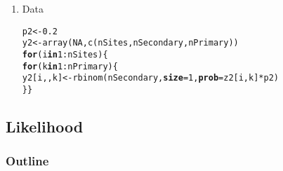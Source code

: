 \documentclass[color=usenames,dvipsnames]{beamer}\usepackage[]{graphicx}\usepackage[]{color}
\makeatletter
\newcommand{\hlnum}[1]{\textcolor[rgb]{0.69,0.494,0}{#1}}%
\newcommand{\hlopt}[1]{\textcolor[rgb]{0,0,0}{#1}}%
\newcommand{\hlstd}[1]{\textcolor[rgb]{0,0,0}{#1}}%
\newcommand{\hlkwa}[1]{\textcolor[rgb]{0,0,0}{\textbf{#1}}}%
\newcommand{\hlkwb}[1]{\textcolor[rgb]{0,0.341,0.682}{#1}}%
\newcommand{\hlkwc}[1]{\textcolor[rgb]{0,0,0}{\textbf{#1}}}%
\newcommand{\hlkwd}[1]{\textcolor[rgb]{0.004,0.004,0.506}{#1}}%
\newenvironment{kframe}{%
 \def\at@end@of@kframe{}%
 \ifinner\ifhmode%
  \def\at@end@of@kframe{\end{minipage}}%
  \begin{minipage}{\columnwidth}%
 \fi\fi%
 \def\FrameCommand##1{\hskip\@totalleftmargin \hskip-\fboxsep
 \colorbox{shadecolor}{##1}\hskip-\fboxsep
     \hskip-\linewidth \hskip-\@totalleftmargin \hskip\columnwidth}%
 \MakeFramed {\advance\hsize-\width
   \@totalleftmargin\z@ \linewidth\hsize
   \@setminipage}}%
 {\par\unskip\endMakeFramed%
 \at@end@of@kframe}
\newenvironment{knitrout}{}{} %
\makeatother
\begin{document}
\begin{frame}[fragile]
\begin{enumerate}[<+->]
  \item Data
\begin{knitrout}\scriptsize
{}\color{fgcolor}\begin{kframe}
\begin{alltt}
\hlstd{p2} \hlkwb{<-} \hlnum{0.2}
\hlstd{y2} \hlkwb{<-} \hlkwd{array}\hlstd{(}\hlnum{NA}\hlstd{,} \hlkwd{c}\hlstd{(nSites, nSecondary, nPrimary))}
\hlkwa{for}\hlstd{(i} \hlkwa{in} \hlnum{1}\hlopt{:}\hlstd{nSites) \{}
    \hlkwa{for}\hlstd{(k} \hlkwa{in} \hlnum{1}\hlopt{:}\hlstd{nPrimary) \{}
        \hlstd{y2[i,,k]} \hlkwb{<-} \hlkwd{rbinom}\hlstd{(nSecondary,} \hlkwc{size}\hlstd{=}\hlnum{1}\hlstd{,} \hlkwc{prob}\hlstd{=z2[i,k]}\hlopt{*}\hlstd{p2)}
    \hlstd{\} \}}
\end{alltt}
\end{kframe}
\end{knitrout}
\end{enumerate}
\end{frame}






\subsection{Likelihood}

\begin{frame}
  \frametitle{Outline}
  \Large
  \tableofcontents[currentsection]
\end{frame}
\end{document}
